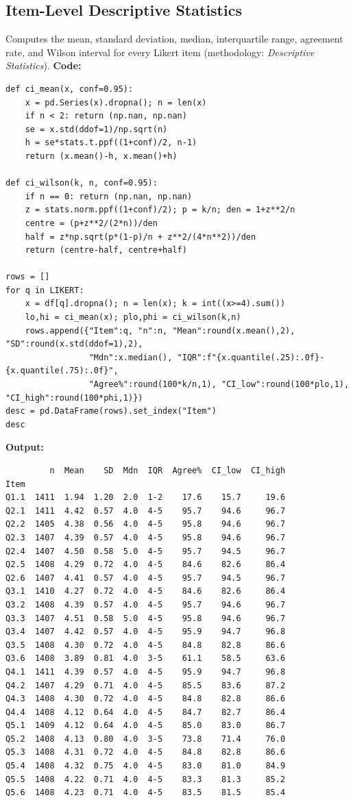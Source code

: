 \subsection{Item-Level Descriptive Statistics}
Computes the mean, standard deviation, median, interquartile range, agreement rate, and Wilson interval for every Likert item (methodology: \emph{Descriptive Statistics}).
\noindent\textbf{Code:}\nopagebreak
{\tiny\begin{verbatim}
def ci_mean(x, conf=0.95):
    x = pd.Series(x).dropna(); n = len(x)
    if n < 2: return (np.nan, np.nan)
    se = x.std(ddof=1)/np.sqrt(n)
    h = se*stats.t.ppf((1+conf)/2, n-1)
    return (x.mean()-h, x.mean()+h)

def ci_wilson(k, n, conf=0.95):
    if n == 0: return (np.nan, np.nan)
    z = stats.norm.ppf((1+conf)/2); p = k/n; den = 1+z**2/n
    centre = (p+z**2/(2*n))/den
    half = z*np.sqrt(p*(1-p)/n + z**2/(4*n**2))/den
    return (centre-half, centre+half)

rows = []
for q in LIKERT:
    x = df[q].dropna(); n = len(x); k = int((x>=4).sum())
    lo,hi = ci_mean(x); plo,phi = ci_wilson(k,n)
    rows.append({"Item":q, "n":n, "Mean":round(x.mean(),2), "SD":round(x.std(ddof=1),2),
                 "Mdn":x.median(), "IQR":f"{x.quantile(.25):.0f}-{x.quantile(.75):.0f}",
                 "Agree%":round(100*k/n,1), "CI_low":round(100*plo,1), "CI_high":round(100*phi,1)})
desc = pd.DataFrame(rows).set_index("Item")
desc
\end{verbatim}}
\noindent\textbf{Output:}\nopagebreak
{\scriptsize\begin{verbatim}
         n  Mean    SD  Mdn  IQR  Agree%  CI_low  CI_high
Item
Q1.1  1411  1.94  1.20  2.0  1-2    17.6    15.7     19.6
Q2.1  1411  4.42  0.57  4.0  4-5    95.7    94.6     96.7
Q2.2  1405  4.38  0.56  4.0  4-5    95.8    94.6     96.7
Q2.3  1407  4.39  0.57  4.0  4-5    95.8    94.6     96.7
Q2.4  1407  4.50  0.58  5.0  4-5    95.7    94.5     96.7
Q2.5  1408  4.29  0.72  4.0  4-5    84.6    82.6     86.4
Q2.6  1407  4.41  0.57  4.0  4-5    95.7    94.5     96.7
Q3.1  1410  4.27  0.72  4.0  4-5    84.6    82.6     86.4
Q3.2  1408  4.39  0.57  4.0  4-5    95.7    94.6     96.7
Q3.3  1407  4.51  0.58  5.0  4-5    95.8    94.6     96.7
Q3.4  1407  4.42  0.57  4.0  4-5    95.9    94.7     96.8
Q3.5  1408  4.30  0.72  4.0  4-5    84.8    82.8     86.6
Q3.6  1408  3.89  0.81  4.0  3-5    61.1    58.5     63.6
Q4.1  1411  4.39  0.57  4.0  4-5    95.9    94.7     96.8
Q4.2  1407  4.29  0.71  4.0  4-5    85.5    83.6     87.2
Q4.3  1408  4.30  0.72  4.0  4-5    84.8    82.8     86.6
Q4.4  1408  4.12  0.64  4.0  4-5    84.7    82.7     86.4
Q5.1  1409  4.12  0.64  4.0  4-5    85.0    83.0     86.7
Q5.2  1408  4.13  0.80  4.0  3-5    73.8    71.4     76.0
Q5.3  1408  4.31  0.72  4.0  4-5    84.8    82.8     86.6
Q5.4  1408  4.32  0.75  4.0  4-5    83.0    81.0     84.9
Q5.5  1408  4.22  0.71  4.0  4-5    83.3    81.3     85.2
Q5.6  1408  4.23  0.71  4.0  4-5    83.5    81.5     85.4
\end{verbatim}}

